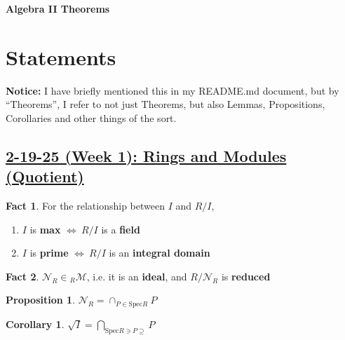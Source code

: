 \documentclass[12pt,a4paper]{article}
\theoremstyle{definition}
\newtheorem{proposition}{Proposition}
\newtheorem{corollary}{Corollary}
\newtheorem{fact}{Fact}
\begin{document}
\begin{center}
  {\Large \bf Algebra II Theorems}\\[6pt]
\end{center}

\section*{Statements}
\begin{mdframed}
\textbf{Notice:} I have briefly mentioned this in my README.md document, but by ``Theorems'', I refer to not just Theorems, but also Lemmas, Propositions, Corollaries and other things of the sort.
\end{mdframed}

\setcounter{subsection}{1}
\setcounter{theorem}{0}
\setcounter{lemma}{0}
\setcounter{proposition}{0}
\setcounter{corollary}{0}
\setcounter{fact}{0}
\setcounter{claim}{0}
\setcounter{example}{0}
\subsection*{\underline{\textbf{2-19-25 (Week 1): Rings and Modules (Quotient)}}}
\begin{fact}
  For the relationship between $I$ and $R/I$,
  \begin{enumerate} [(1)]
    \item $I$ is \textbf{max} $\Leftrightarrow \ R/I$ is a \textbf{field}
    \item $I$ is \textbf{prime} $\Leftrightarrow \ R/I$ is an \textbf{integral domain}
  \end{enumerate}
\end{fact}
\vspace{0.125em}

\begin{fact}
  $\mathcal{N}_R \in \text{}_R \mathcal{M}$, i.e. it is an \textbf{ideal}, and \underline{$R/\mathcal{N}_R$} is \textbf{reduced}
\end{fact}
\vspace{0.125em}

\begin{proposition}
  $\boxed{\mathcal{N}_R = \cap_{P \in \text{Spec}R} P}$
\end{proposition}
\vspace{0.125em}

\begin{corollary}
  $\sqrt{I} = \bigcap_{\text{Spec}R \ni P \supseteq} P$
\end{corollary}
\vspace{0.125em}
\end{document}
